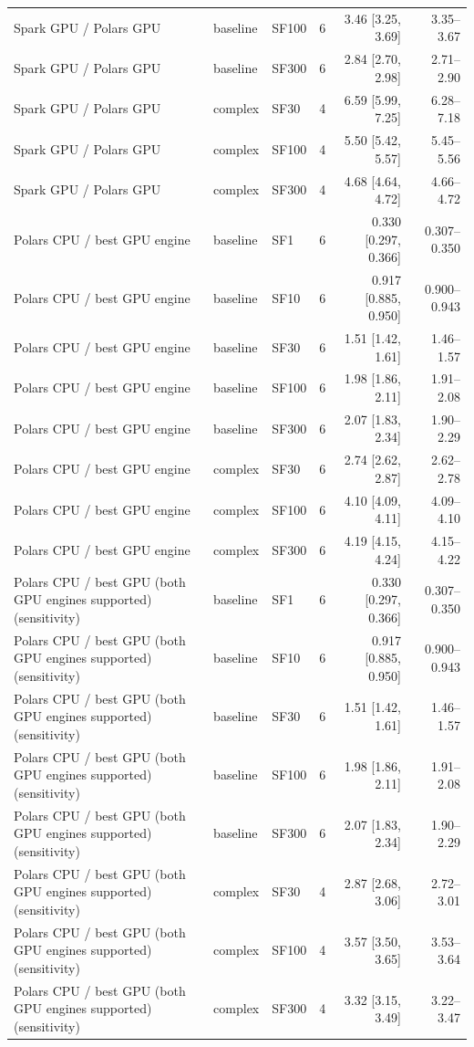 \begin{tabular}{lllrrr}
Spark GPU / Polars GPU & baseline & SF100 & 6 & 3.46 [3.25, 3.69] & 3.35--3.67 \\
Spark GPU / Polars GPU & baseline & SF300 & 6 & 2.84 [2.70, 2.98] & 2.71--2.90 \\
Spark GPU / Polars GPU & complex & SF30 & 4 & 6.59 [5.99, 7.25] & 6.28--7.18 \\
Spark GPU / Polars GPU & complex & SF100 & 4 & 5.50 [5.42, 5.57] & 5.45--5.56 \\
Spark GPU / Polars GPU & complex & SF300 & 4 & 4.68 [4.64, 4.72] & 4.66--4.72 \\
Polars CPU / best GPU engine & baseline & SF1 & 6 & 0.330 [0.297, 0.366] & 0.307--0.350 \\
Polars CPU / best GPU engine & baseline & SF10 & 6 & 0.917 [0.885, 0.950] & 0.900--0.943 \\
Polars CPU / best GPU engine & baseline & SF30 & 6 & 1.51 [1.42, 1.61] & 1.46--1.57 \\
Polars CPU / best GPU engine & baseline & SF100 & 6 & 1.98 [1.86, 2.11] & 1.91--2.08 \\
Polars CPU / best GPU engine & baseline & SF300 & 6 & 2.07 [1.83, 2.34] & 1.90--2.29 \\
Polars CPU / best GPU engine & complex & SF30 & 6 & 2.74 [2.62, 2.87] & 2.62--2.78 \\
Polars CPU / best GPU engine & complex & SF100 & 6 & 4.10 [4.09, 4.11] & 4.09--4.10 \\
Polars CPU / best GPU engine & complex & SF300 & 6 & 4.19 [4.15, 4.24] & 4.15--4.22 \\
Polars CPU / best GPU (both GPU engines supported) (sensitivity) & baseline & SF1 & 6 & 0.330 [0.297, 0.366] & 0.307--0.350 \\
Polars CPU / best GPU (both GPU engines supported) (sensitivity) & baseline & SF10 & 6 & 0.917 [0.885, 0.950] & 0.900--0.943 \\
Polars CPU / best GPU (both GPU engines supported) (sensitivity) & baseline & SF30 & 6 & 1.51 [1.42, 1.61] & 1.46--1.57 \\
Polars CPU / best GPU (both GPU engines supported) (sensitivity) & baseline & SF100 & 6 & 1.98 [1.86, 2.11] & 1.91--2.08 \\
Polars CPU / best GPU (both GPU engines supported) (sensitivity) & baseline & SF300 & 6 & 2.07 [1.83, 2.34] & 1.90--2.29 \\
Polars CPU / best GPU (both GPU engines supported) (sensitivity) & complex & SF30 & 4 & 2.87 [2.68, 3.06] & 2.72--3.01 \\
Polars CPU / best GPU (both GPU engines supported) (sensitivity) & complex & SF100 & 4 & 3.57 [3.50, 3.65] & 3.53--3.64 \\
Polars CPU / best GPU (both GPU engines supported) (sensitivity) & complex & SF300 & 4 & 3.32 [3.15, 3.49] & 3.22--3.47 \\
\bottomrule
\end{tabular}
